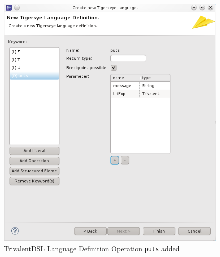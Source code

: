 \documentclass[article,colorback,accentcolor=tud4c]{tudreport}
\begin{document}
	\begin{figure}
	  \centering
	  \includegraphics[scale=.5,keepaspectratio=true]{./pics/example_newlang_operationadded.png}
	  \caption{TrivalentDSL Language Definition Operation \texttt{puts} added}\label{fig:example_newlang_operationadded}
	\end{figure}
	
\end{document}
